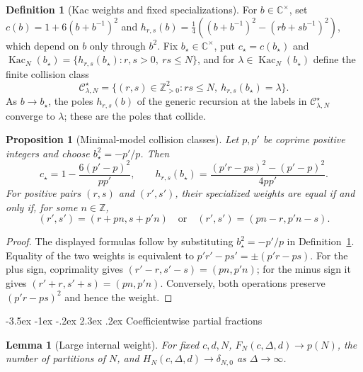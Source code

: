 \documentclass[twoside,10pt]{article}
\makeatletter
\numberwithin{equation}{section}
\theoremstyle{slbody}
\newtheorem{proposition}[theorem]{Proposition}
\newtheorem{lemma}[theorem]{Lemma}
\theoremstyle{definition}
\newtheorem{definition}[theorem]{Definition}
\theoremstyle{remark}
\renewcommand{\section}{%
  \@startsection{section}{1}{\z@}%
    {-3.5ex \@plus -1ex \@minus -.2ex}%
    {2.3ex \@plus .2ex}%
    {\normalfont\large\bfseries}}
\makeatother
\begin{document}
\begin{definition}[Kac weights and fixed specializations]
\label{def:fixed-specialization}
For \(b\in\mathbb C^\times\), set
\(c(b)=1+6(b+b^{-1})^2\) and
\(h_{r,s}(b)=\frac14((b+b^{-1})^2-(rb+sb^{-1})^2)\),
which depend on \(b\) only through \(b^2\).  Fix \(b_\star\in\mathbb C^\times\),
put \(c_\star=c(b_\star)\) and
\(\operatorname{Kac}_N(b_\star)=\{h_{r,s}(b_\star):r,s>0,\ rs\leq N\}\), and for
\(\lambda\in\operatorname{Kac}_N(b_\star)\) define the finite collision class
\[
 {\mathcal C}^{\star}_{\lambda,N}
 =\{(r,s)\in\mathbb Z_{>0}^2:
      rs\leq N,\ h_{r,s}(b_\star)=\lambda\}.
\]
As \(b\to b_\star\), the poles \(h_{r,s}(b)\) of the generic recursion at the
labels in \({\mathcal C}^\star_{\lambda,N}\) converge to \(\lambda\); these are
the poles that collide.
\end{definition}

\begin{proposition}[Minimal-model collision classes]
\label{prop:minimal-collisions}
Let \(p,p'\) be coprime positive integers and choose
\(b_\star^2=-p'/p\).  Then
\[
 c_\star=1-\frac{6(p'-p)^2}{pp'},\qquad
 h_{r,s}(b_\star)
 =\frac{(p'r-ps)^2-(p'-p)^2}{4pp'}.
\]
For positive pairs \((r,s)\) and \((r',s')\), their specialized weights
are equal if and only if, for some \(n\in\mathbb Z\),
\[
 (r',s')=(r+pn,s+p'n)
 \quad\text{or}\quad
 (r',s')=(pn-r,p'n-s).
\]
\end{proposition}

\begin{proof}
The displayed formulas follow by substituting \(b_\star^2=-p'/p\) in
Definition~\ref{def:fixed-specialization}.  Equality of the two weights is
equivalent to \(p'r'-ps'=\pm(p'r-ps)\).  For the plus sign, coprimality gives
\((r'-r,s'-s)=(pn,p'n)\); for the minus sign it gives
\((r'+r,s'+s)=(pn,p'n)\).  Conversely, both operations preserve
\((p'r-ps)^2\) and hence the weight.
\end{proof}


\section{Coefficientwise partial fractions}\label{sec:partial-fractions}

\begin{lemma}[Large internal weight]\label{lem:large-weight}
For fixed \(c,d,N\), \(F_N(c,\Delta,d)\to p(N)\), the number of partitions
of \(N\), and \(H_N(c,\Delta,d)\to\delta_{N,0}\) as \(\Delta\to\infty\).
\end{lemma}
\end{document}
